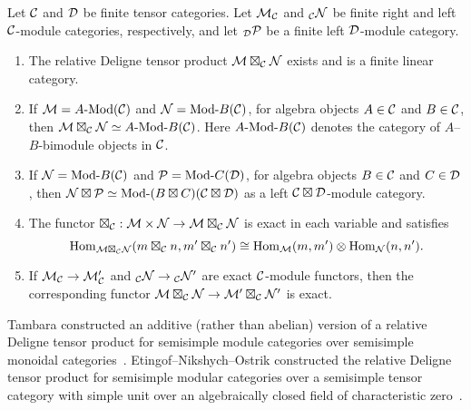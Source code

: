 \documentclass{amsart}
\begin{document}
\begin{theorem} \label{thm:DelignePrdtOverATCExists}
	Let $\mathcal C$ and $\mathcal D$ be finite tensor categories.  Let $\mathcal M_{\mathcal C}$ and ${}_{\mathcal C}\mathcal N$ be finite right and left $\mathcal C$-module categories, respectively, and let ${}_{\mathcal D}\mathcal P$ be a finite left $\mathcal D$-module category. 
	\begin{enumerate}
		\item The relative Deligne tensor product $\mathcal M \boxtimes_{\mathcal C} \mathcal N$ exists and is a finite linear category.
		\item If $\cM = \Mod{A}{}(\cC)$ and $\cN = \Mod{}{B}(\cC)$, for algebra objects $A \in \mathcal C$ and $B \in \mathcal C$, then $\cM \boxtimes_{\cC} \cN \simeq \Mod{A }{B}(\cC)$. Here $\Mod{A}{B}(\cC)$ denotes the category of $A$--$B$-bimodule objects in $\mathcal C$.
		\item If $\cN = \Mod{}{B}(\cC)$ and $\cP = \Mod{}{C}(\cD)$, for algebra objects $B \in \mathcal C$ and $C \in \mathcal D$, then $\cN \boxtimes \cP \simeq \Mod{}{(B \boxtimes C)}(\cC \boxtimes \cD)$ as a left $\mathcal C \boxtimes \mathcal D$-module category.
		\item The functor $\boxtimes_{\mathcal C}: \mathcal M \times \mathcal N \rightarrow \mathcal M \boxtimes_\mathcal C \mathcal N$ is exact in each variable and satisfies 
		\begin{equation*}
			\operatorname{Hom}_{\mathcal M \boxtimes_{\mathcal C} \mathcal N} (m \boxtimes_\mathcal C n, m' \boxtimes_\mathcal C n') \cong \operatorname{Hom}_{\mathcal M}(m,m') \otimes \operatorname{Hom}_{\mathcal N}(n, n').
		\end{equation*}
		\item If $\mathcal M_\mathcal C \rightarrow \mathcal M'_\mathcal C$ and ${}_\mathcal C \mathcal N \rightarrow {}_\mathcal C \mathcal N'$ are exact $\mathcal C$-module functors, then the corresponding functor $\mathcal M \boxtimes_\mathcal C \mathcal N \rightarrow \mathcal M' \boxtimes_\mathcal C \mathcal N'$ is exact.
	\end{enumerate} 
\end{theorem} %
\nid Tambara constructed an additive (rather than abelian) version of a relative Deligne tensor product for semisimple module categories over semisimple monoidal categories~\cite{tambara}.  Etingof--Nikshych--Ostrik constructed the relative Deligne tensor product for semisimple modular categories over a semisimple tensor category with simple unit over an algebraically closed field of characteristic zero~\cite{0909.3140}.   
\end{document}
